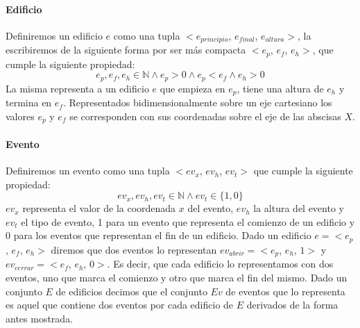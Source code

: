 \paragraph{Edificio}
Definiremos un edificio $e$ como una tupla $<e_{principio}$, $e_{final}$, $e_{altura}>$, la escribiremos de la siguiente forma por ser más compacta $<e_p$, $e_f$, $e_h>$, que cumple la siguiente propiedad:
\begin{displaymath}
	e_p, e_f, e_h \in \mathbb{N} \land e_p > 0 \land e_p < e_f \land e_h > 0
\end{displaymath}
La misma representa a un edificio $e$ que empieza en $e_p$, tiene una altura de $e_h$ y termina en $e_f$. 
Representados bidimensionalmente sobre un eje cartesiano los valores $e_p$ y $e_f$ se corresponden con
sus coordenadas sobre el eje de las abscisas $X$.

\paragraph{Evento}
Definiremos un evento como una tupla $<ev_x$, $ev_h$, $ev_t>$ que cumple la siguiente propiedad:
\begin{displaymath}
	ev_x, ev_h, ev_t \in \mathbb{N} \land ev_t \in \{ 1, 0\}
\end{displaymath}
$ev_x$ representa el valor de la coordenada $x$ del evento, $ev_h$ la altura del evento y $ev_t$ el tipo de 
evento, 1 para un evento que representa el comienzo de un edificio y 0 para los eventos que representan el fin de un edificio.
Dado un edificio $e = <e_p$, $e_f$, $e_h>$  diremos que dos eventos lo representan $ev_{abrir} = <e_p$, $e_h$, $1>$ y $ev_{cerrar} = <e_f$, $e_h$, $0>$.
Es decir, que cada edificio lo representamos con dos eventos, uno que marca el comienzo y otro que marca el fin del mismo. 
Dado un conjunto $E$ de edificios decimos que el conjunto $Ev$ de eventos que lo representa es aquel que contiene dos eventos
por cada edificio de $E$ derivados de la forma antes mostrada.


